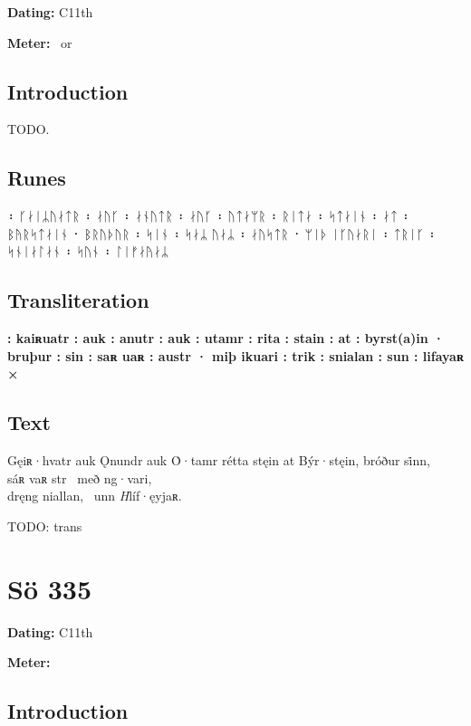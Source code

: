 \begin{flushright}%
\textbf{Dating:} C11th

\textbf{Meter:} \Fornyrdislag\ or \Kviduhattr
\end{flushright}%

\subsection{Introduction}

TODO.

\subsection{Runes}

᛬ ᚴᛅᛁᛦᚢᛅᛏᚱ ᛬ ᛅᚢᚴ ᛬ ᛅᚾᚢᛏᚱ ᛬ ᛅᚢᚴ ᛬ ᚢᛏᛅᛘᚱ ᛬ ᚱᛁᛏᛅ ᛬ ᛋᛏᛅᛁᚾ ᛬ ᛅᛏ ᛬ ᛒᚤᚱᛋᛏᛅᛁᚾ ᛫ ᛒᚱᚢᚦᚢᚱ ᛬ ᛋᛁᚾ ᛬ ᛋᛅᛦ ᚢᛅᛦ ᛬ ᛅᚢᛋᛏᚱ ᛫ ᛘᛁᚦ ᛁᚴᚢᛅᚱᛁ ᛬ ᛏᚱᛁᚴ ᛬ ᛋᚾᛁᛅᛚᛅᚾ ᛬ ᛋᚢᚾ ᛬ ᛚᛁᚠᛅᚤᛅᛦ%

\subsection{Transliteration}

\textbf{: kaiʀuatr : auk : anutr : auk : utamr : rita : stain : at : byrst(a)in · bruþur : sin : saʀ uaʀ : austr · miþ ikuari : trik : snialan : sun : lifayaʀ ×}

\subsection{Text}

\bpg\bpa[0]%
Gęiʀ·hvatr auk Ǫnundr auk Ȯ·tamr rétta stęin at Býr·stęin, bróður si̇nn, \\
sáʀ vaʀ str \hld\ með ng·vari, \\
dręng niallan, \hld\ unn \emph{H}líf·ęyjaʀ.\epa

\bpb TODO: trans\epb\epg

\sectionline\clearpage


\section{Sö 335}

\begin{flushright}%
\textbf{Dating:} C11th

\textbf{Meter:} \Fornyrdislag
\end{flushright}%

\subsection{Introduction}

